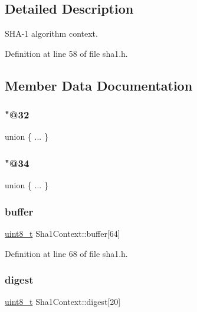 \subsection{Detailed Description}
S\+H\+A-\/1 algorithm context. 

Definition at line 58 of file sha1.\+h.



\subsection{Member Data Documentation}
\mbox{\label{structSha1Context_aca496670020a467bd6762747a9f2825d}} 
\subsubsection{\texorpdfstring{"@32}{@32}}
{\footnotesize\ttfamily union \{ ... \} }

\mbox{\label{structSha1Context_a36dd8b1d71a8ea0ac04ad90fc80ee1db}} 
\subsubsection{\texorpdfstring{"@34}{@34}}
{\footnotesize\ttfamily union \{ ... \} }

\mbox{\label{structSha1Context_adb9a17a4ed76d2d5be86b8d33766e796}} 
\subsubsection{\texorpdfstring{buffer}{buffer}}
{\footnotesize\ttfamily \hyperlink{stdint_8h_aba7bc1797add20fe3efdf37ced1182c5}{uint8\+\_\+t} Sha1\+Context\+::buffer\mbox{[}64\mbox{]}}



Definition at line 68 of file sha1.\+h.

\mbox{\label{structSha1Context_aa763a9ba0f9014894b8af6171eaf2a20}} 
\subsubsection{\texorpdfstring{digest}{digest}}
{\footnotesize\ttfamily \hyperlink{stdint_8h_aba7bc1797add20fe3efdf37ced1182c5}{uint8\+\_\+t} Sha1\+Context\+::digest\mbox{[}20\mbox{]}}




